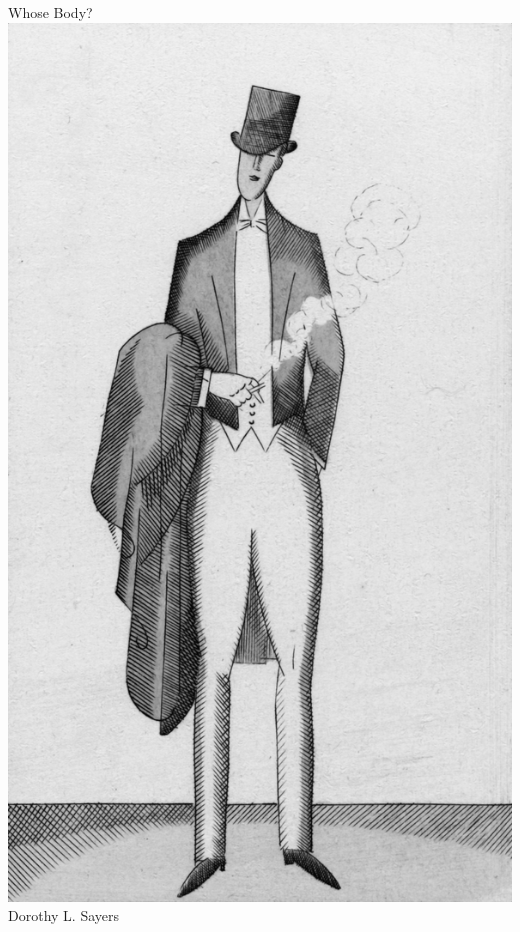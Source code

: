 \documentclass[
paper=5.5in:8.5in,
BCOR=7mm,
twoside,
DIV=calc,
12pt,
usegeometry,
chapterprefix,
headings=big]{scrbook} %
\newcommand{\reasonablyhuge}{\fontsize{50}{60}\selectfont}
\def\coverimagesize{.5\linewidth}
\newcommand{\HUGE}{\fontsize{90}{90}\selectfont}
\def\coverimagesize{0.55\linewidth}
\newcommand{\HUGE}{\fontsize{90}{90}\selectfont}
\begin{document}
\setlength{\epigraphwidth}{0.8\textwidth}
\renewcommand{\epigraphflush}{center}
\renewcommand{\sourceflush}{center}
\renewcommand*{\chaptermarkformat}{}
\renewcommand*{\chapterheadendvskip}{\vspace{10pt}}
\renewcommand*{\chapterheadstartvskip}{\vspace{0pt}}

\frontmatter
\pagestyle{empty}
\begin{titlepage}

   \recalctypearea

  \begin{center}\mytitlefont
{\HUGE Whose Body?}\\
\vspace{0.2cm}
\includegraphics[width=\coverimagesize]{dude}\\
\vspace{0.5cm}
\mytitlefont
{\reasonablyhuge Dorothy L. Sayers}\\
\end{center}



\end{titlepage}
\end{document}
